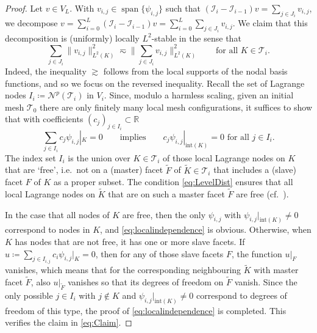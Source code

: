 \documentclass{amsart}
\providecommand{\tria}{\mathcal{T}}
\DeclareMathOperator{\Span}{span}
\newcommand{\be}{\begin{equation}}
\newcommand{\ee}{\end{equation}}
\begin{document}
\begin{proof} Let $v \in V_L$. With $v_{i,j}\in \Span\{\psi_{i,j}\}$ such that $ (\mathcal{I}_i-\mathcal{I}_{i-1})v=\sum_{j \in J_i} v_{i,j}$, we decompose $v=\sum_{i=0}^L  (\mathcal{I}_i-\mathcal{I}_{i-1})v=\sum_{i=0}^L \sum_{j \in J_i}v_{i,j}$.
We claim that this decomposition is (uniformly) locally $L^2$-stable in the sense that
\begin{equation}\label{eq:Claim}
\sum_{j \in J_i} \|v_{i,j}\|_{L^2(K)}^2 \eqsim \Big\| \sum_{j \in J_i} v_{i,j}\Big\|_{L^2(K)}^2\qquad \text{for all }K\in \tria_i.
\end{equation}
Indeed, the inequality $\gtrsim$ follows from the local supports of the nodal basis functions, and so we focus on the reversed inequality.
Recall the set of Lagrange nodes $I_i\coloneqq\mathcal{N}^p(\tria_i)$ in $V_i$.
Since, modulo a harmless scaling, given an initial mesh $\tria_0$ there are only finitely many local mesh configurations, it suffices to show that with coefficients $(c_j)_{j \in I_i}\subset \mathbb{R}$
\be \label{eq:localindependence}
\sum_{j \in I_i} c_j \psi_{i,j}|_K=0\qquad \text{implies}\qquad c_j \psi_{i,j} |_{\text{int}(K)}=0  \text{ for all }j \in I_i.
\ee
The index set $I_i$ is the union over $K \in \tria_i$ of those local Lagrange nodes on $K$ that are `free', i.e.~not on a (master) facet $\tilde{F}$ of $\tilde{K} \in \tria_i$ that includes a (slave) facet $F$ of $K$ as a proper subset. The condition \eqref{eq:LevelDist} ensures that all local Lagrange nodes on $\tilde{K}$ that are on such a master facet $\tilde{F}$ are free
(cf.~\cite{GantnerStevenson23}).

In the case that all nodes of $K$ are free, then the only $\psi_{i,j}$ with $\psi_{i,j}|_{\text{int}(K)} \neq 0$ correspond to nodes in $K$, and \eqref{eq:localindependence} is obvious.
Otherwise, when $K$ has nodes that are not free, it has one or more slave facets.
If $u\coloneqq \sum_{j \in I_{i,j}} c_i \psi_{i,j}|_K=0$, then for any of those slave facets $F$, the function $u|_F$ vanishes, which means that for the corresponding neighbouring $\tilde{K}$ with master facet $\tilde{F}$, also $u|_{\tilde{F}}$ vanishes so that its degrees of freedom on $\tilde{F}$ vanish. Since the only possible $j \in I_i$ with $j \not\in K$ and $\psi_{i,j}|_{\text{int}(K)} \neq 0$ correspond to degrees of freedom of this type, the proof of \eqref{eq:localindependence} is completed. This verifies the claim in \eqref{eq:Claim}.


\end{proof}
\end{document}
